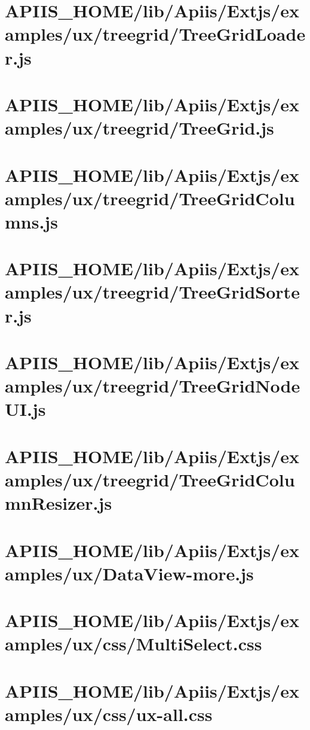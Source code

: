 \section{APIIS\_HOME/lib/Apiis/Extjs/examples/ux/treegrid/TreeGridLoader.js} 
\section{APIIS\_HOME/lib/Apiis/Extjs/examples/ux/treegrid/TreeGrid.js} 
\section{APIIS\_HOME/lib/Apiis/Extjs/examples/ux/treegrid/TreeGridColumns.js} 
\section{APIIS\_HOME/lib/Apiis/Extjs/examples/ux/treegrid/TreeGridSorter.js} 
\section{APIIS\_HOME/lib/Apiis/Extjs/examples/ux/treegrid/TreeGridNodeUI.js} 
\section{APIIS\_HOME/lib/Apiis/Extjs/examples/ux/treegrid/TreeGridColumnResizer.js} 
\section{APIIS\_HOME/lib/Apiis/Extjs/examples/ux/DataView-more.js} 
\section{APIIS\_HOME/lib/Apiis/Extjs/examples/ux/css/MultiSelect.css} 
\section{APIIS\_HOME/lib/Apiis/Extjs/examples/ux/css/ux-all.css} 
